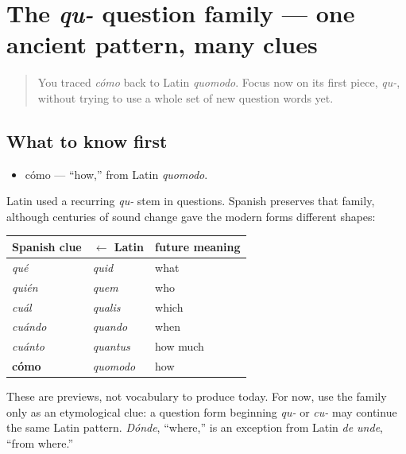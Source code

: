 \section[qu-]{The \emph{qu-} question family — one ancient pattern, many clues}

\label{lesson:ES-C03-familia-qu}



\begin{quote}
You traced \emph{cómo} back to Latin \emph{quomodo}. Focus now on its first piece, \emph{qu-}, without trying to use a whole set of new question words yet.
\end{quote}

\subsection*{What to know first}
\begin{itemize}
\raggedright
  \item cómo — \textquotedblleft{}how,\textquotedblright{} from Latin \emph{quomodo}.
\end{itemize}

\begin{cousinweb}
Latin used a recurring \emph{qu-} stem in questions. Spanish preserves that family, although centuries of sound change gave the modern forms different shapes:

\noindent
\begin{tabularx}{\linewidth}{@{}>{\raggedright\arraybackslash}X>{\raggedright\arraybackslash}X>{\raggedright\arraybackslash}X@{}}
\toprule
\textbf{Spanish clue} & \textbf{$\leftarrow$ Latin} & \textbf{future meaning} \\
\midrule
\emph{qué} & \emph{quid} & what \\
\emph{quién} & \emph{quem} & who \\
\emph{cuál} & \emph{qualis} & which \\
\emph{cuándo} & \emph{quando} & when \\
\emph{cuánto} & \emph{quantus} & how much \\
\textbf{cómo} & \emph{quomodo} & how \\
\bottomrule
\end{tabularx}

These are previews, not vocabulary to produce today. For now, use the family only as an etymological clue: a question form beginning \emph{qu-} or \emph{cu-} may continue the same Latin pattern. \emph{Dónde}, \textquotedblleft{}where,\textquotedblright{} is an exception from Latin \emph{de unde}, \textquotedblleft{}from where.\textquotedblright{}
\end{cousinweb}

